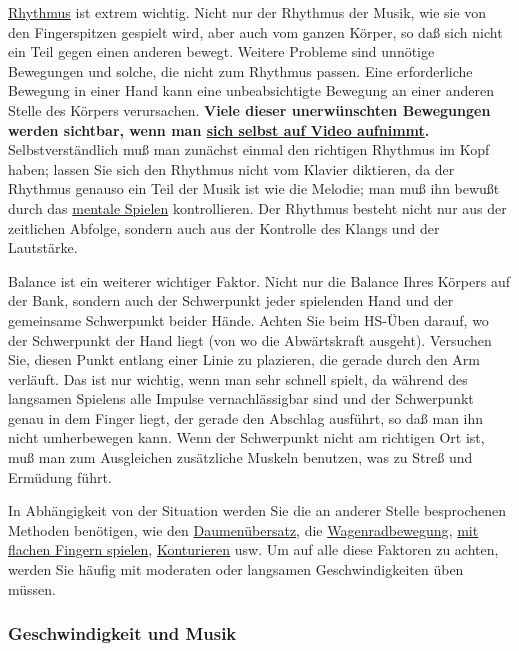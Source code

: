 \hyperlink{c1iii1b}{Rhythmus} ist extrem wichtig.
Nicht nur der Rhythmus der Musik, wie sie von den Fingerspitzen gespielt wird, aber auch vom ganzen Körper, so daß sich nicht ein Teil gegen einen anderen bewegt.
Weitere Probleme sind unnötige Bewegungen und solche, die nicht zum Rhythmus passen.
Eine erforderliche Bewegung in einer Hand kann eine unbeabsichtigte Bewegung an einer anderen Stelle des Körpers verursachen.
\textbf{Viele dieser unerwünschten Bewegungen werden sichtbar, wenn man \hyperlink{c1iii13}{sich selbst auf Video aufnimmt}.}
Selbstverständlich muß man zunächst einmal den richtigen Rhythmus im Kopf haben; lassen Sie sich den Rhythmus nicht vom Klavier diktieren, da der Rhythmus genauso ein Teil der Musik ist wie die Melodie; man muß ihn bewußt durch das \hyperlink{c1ii12}{mentale Spielen} kontrollieren.
Der Rhythmus besteht nicht nur aus der zeitlichen Abfolge, sondern auch aus der Kontrolle des Klangs und der Lautstärke.

Balance ist ein weiterer wichtiger Faktor.
Nicht nur die Balance Ihres Körpers auf der Bank, sondern auch der Schwerpunkt jeder spielenden Hand und der gemeinsame Schwerpunkt beider Hände.
Achten Sie beim HS-Üben darauf, wo der Schwerpunkt der Hand liegt (von wo die Abwärtskraft ausgeht).
Versuchen Sie, diesen Punkt entlang einer Linie zu plazieren, die gerade durch den Arm verläuft.
Das ist nur wichtig, wenn man sehr schnell spielt, da während des langsamen Spielens alle Impulse vernachlässigbar sind und der Schwerpunkt genau in dem Finger liegt, der gerade den Abschlag ausführt, so daß man ihn nicht umherbewegen kann.
Wenn der Schwerpunkt nicht am richtigen Ort ist, muß man zum Ausgleichen zusätzliche Muskeln benutzen, was zu Streß und Ermüdung führt.

In Abhängigkeit von der Situation werden Sie die an anderer Stelle besprochenen Methoden benötigen, wie den \hyperlink{c1iii5b}{Daumenübersatz}, die \hyperlink{c1iii5wagen}{Wagenradbewegung}, \hyperlink{c1iii4b}{mit flachen Fingern spielen}, \hyperlink{c1iii8}{Konturieren} usw.
Um auf alle diese Faktoren zu achten, werden Sie häufig mit moderaten oder langsamen Geschwindigkeiten üben müssen.


\subsubsection{Geschwindigkeit und Musik}\hypertarget{c1iii7iMusik}{}

